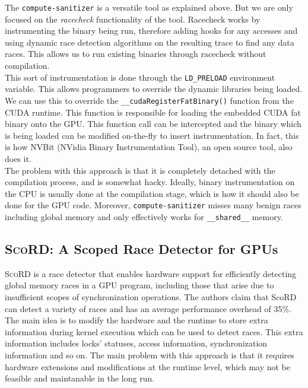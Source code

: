 \documentclass{btp}
\begin{document}
The \texttt{compute-sanitizer} is a versatile tool as explained above. But we are only focused on the \textit{racecheck} functionality of the tool. Racecheck works by instrumenting the binary being run, therefore adding hooks for any accesses and using dynamic race detection algorithms on the resulting trace to find any data races. This allows us to run existing binaries through racecheck without compilation.
\\
\newline
This sort of instrumentation is done through the \texttt{LD\_PRELOAD} environment variable. This allows programmers to override the dynamic libraries being loaded. We can use this to override the \texttt{\_\_cudaRegisterFatBinary()} function from the CUDA runtime. This function is responsible for loading the embedded CUDA fat binary onto the GPU. This function call can be intercepted and the binary which is being loaded can be modified on-the-fly to insert instrumentation. In fact, this is how NVBit \cite{nvbit} (NVidia Binary Instrumentation Tool), an open source tool, also does it.
\\
\newline
The problem with this approach is that it is completely detached with the compilation process, and is somewhat hacky. Ideally, binary instrumentation on the CPU is usually done at the compilation stage, which is how it should also be done for the GPU code. Moreover, \texttt{compute-sanitizer} misses many benign races including global memory and only effectively works for \texttt{\_\_shared\_\_} memory.

\subsection{\textsc{ScoRD}: A Scoped Race Detector for GPUs}

\textsc{ScoRD} \cite{scord} is a race detector that enables hardware support for efficiently detecting global memory races in a GPU program, including those that arise due to insufficient scopes of synchronization operations. The authors claim that ScoRD can detect a variety of races and has an average performance overhead of 35\%.
\\
\newline
The main idea is to modify the hardware and the runtime to store extra information during kernel execution which can be used to detect races. This extra information includes locks' statuses, access information, synchronization information and so on. The main problem with this approach is that it requires hardware extensions and modifications at the runtime level, which may not be feasible and maintanable in the long run.
\end{document}
